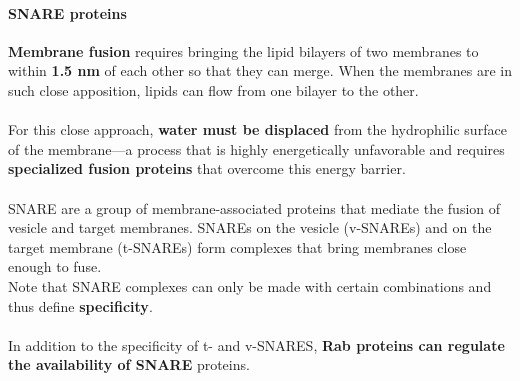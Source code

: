 \documentclass[../main.tex]{subfiles}
\begin{document}
\paragraph{SNARE proteins}

\textbf{Membrane fusion} requires bringing the lipid bilayers of two membranes to within \textbf{1.5 nm} of each other so that they can merge. When 
the membranes are in such close apposition, lipids can flow from one bilayer to the other. \\
\\
For this close approach, \textbf{water must be displaced} from the hydrophilic surface of the membrane—a process that is highly energetically unfavorable and requires \textbf{specialized fusion proteins} that overcome this energy barrier.\\
\\
\gls{SNARE} are a group of membrane-associated proteins that mediate the fusion of vesicle and target membranes. SNAREs on the vesicle (v-SNAREs) and on the target membrane (t-SNAREs) form complexes that bring membranes close enough to fuse. \\
Note that SNARE complexes can only be made with certain combinations and thus define \textbf{specificity}. \\
\\
In addition to the specificity of t- and v-SNARES, \textbf{Rab proteins can regulate the availability of SNARE} proteins. 
\end{document}
